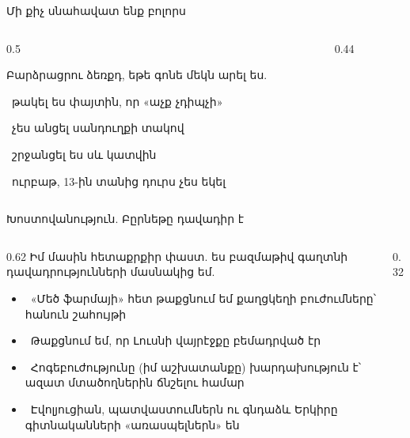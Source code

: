 \begin{frame}{Մի քիչ սնահավատ ենք բոլորս}
  \begin{columns}[c]
    \begin{column}{0.5\textwidth}
      \begin{poll}
        Բարձրացրու ձեռքդ, եթե գոնե մեկն արել ես.\par\smallskip
        \ թակել ես փայտին, որ «աչք չդիպչի»\par
        \ չես անցել սանդուղքի տակով\par
        \ շրջանցել ես սև կատվին\par
        \ ուրբաթ, 13-ին տանից դուրս չես եկել
      \end{poll}
    \end{column}
    \begin{column}{0.44\textwidth}
    \end{column}
  \end{columns}
\end{frame}

\begin{frame}{Խոստովանություն. Բըրնեթը դավադիր է}
  \begin{columns}[c]
    \begin{column}{0.62\textwidth}
      {\blackfont Իմ մասին հետաքրքիր փաստ}. ես բազմաթիվ գաղտնի դավադրությունների մասնակից եմ.\par\smallskip
      \begin{itemize}
        \item<2-> \ «Մեծ ֆարմայի» հետ թաքցնում եմ քաղցկեղի բուժումները՝ հանուն շահույթի
        \item<3-> \ Թաքցնում եմ, որ Լուսնի վայրէջքը բեմադրված էր
        \item<4-> \ Հոգեբուժությունը (իմ աշխատանքը) խարդախություն է՝ ազատ մտածողներին ճնշելու համար
        \item<5-> \ Էվոլյուցիան, պատվաստումներն ու գնդաձև Երկիրը գիտնականների «առասպելներն» են
      \end{itemize}
    \end{column}
    \begin{column}{0.32\textwidth}
      \centering
    \end{column}
  \end{columns}
\end{frame}

